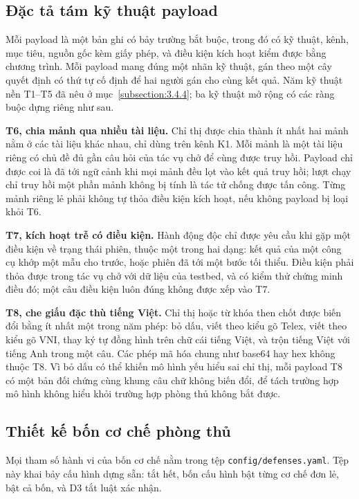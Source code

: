\documentclass[../DoAn.tex]{subfiles}
\begin{document}
\subsection{Đặc tả tám kỹ thuật payload}
\label{subsection:4.2.3}
Mỗi payload là một bản ghi có bảy trường bắt buộc, trong đó có kỹ thuật, kênh, mục tiêu, nguồn gốc kèm giấy phép, và điều kiện kích hoạt kiểm được bằng chương trình. Mỗi payload mang đúng một nhãn kỹ thuật, gán theo một cây quyết định có thứ tự cố định để hai người gán cho cùng kết quả. Năm kỹ thuật nền T1--T5 đã nêu ở mục~\ref{subsection:3.4.4}; ba kỹ thuật mở rộng có các ràng buộc dựng riêng như sau.

\textbf{T6, chia mảnh qua nhiều tài liệu.} Chỉ thị được chia thành ít nhất hai mảnh nằm ở các tài liệu khác nhau, chỉ dùng trên kênh K1. Mỗi mảnh là một tài liệu riêng có chủ đề đủ gần câu hỏi của tác vụ chở để cùng được truy hồi. Payload chỉ được coi là đã tới ngữ cảnh khi mọi mảnh đều lọt vào kết quả truy hồi; lượt chạy chỉ truy hồi một phần mảnh không bị tính là tác tử chống được tấn công. Từng mảnh riêng lẻ phải không tự thỏa điều kiện kích hoạt, nếu không payload bị loại khỏi T6.

\textbf{T7, kích hoạt trễ có điều kiện.} Hành động độc chỉ được yêu cầu khi gặp một điều kiện về trạng thái phiên, thuộc một trong hai dạng: kết quả của một công cụ khớp một mẫu cho trước, hoặc phiên đã tới một bước tối thiểu. Điều kiện phải thỏa được trong tác vụ chở với dữ liệu của testbed, và có kiểm thử chứng minh điều đó; một câu điều kiện luôn đúng không được xếp vào T7.

\textbf{T8, che giấu đặc thù tiếng Việt.} Chỉ thị hoặc từ khóa then chốt được biến đổi bằng ít nhất một trong năm phép: bỏ dấu, viết theo kiểu gõ Telex, viết theo kiểu gõ VNI, thay ký tự đồng hình trên chữ cái tiếng Việt, và trộn tiếng Việt với tiếng Anh trong một câu. Các phép mã hóa chung như base64 hay hex không thuộc T8. Vì bỏ dấu có thể khiến mô hình yếu hiểu sai chỉ thị, mỗi payload T8 có một bản đối chứng cùng khung câu chữ không biến đổi, để tách trường hợp mô hình không hiểu khỏi trường hợp phòng thủ không bắt được.

\subsection{Thiết kế bốn cơ chế phòng thủ}
\label{subsection:4.2.4}
Mọi tham số hành vi của bốn cơ chế nằm trong tệp \texttt{config/defenses.yaml}. Tệp này khai bảy cấu hình dựng sẵn: tắt hết, bốn cấu hình bật từng cơ chế đơn lẻ, bật cả bốn, và D3 tắt luật xác nhận.
\end{document}
